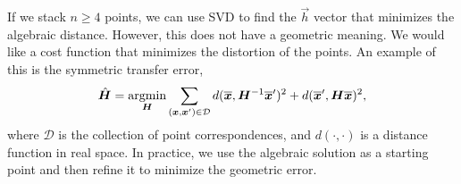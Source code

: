 If we stack $n \geq 4$ points, we can use SVD to find the $\vec{h}$ vector that
minimizes the algebraic distance. However, this does not have a geometric
meaning. We would like a cost function that minimizes the distortion of the
points. An example of this is the symmetric transfer error, \[
    \hat{\bm{H}} = \operatorname*{argmin}_{\bm{H}}
    \sum_{(\bm{x},\bm{x}')\in\mathcal{D}}
    d(\overline{\bm{x}},\bm{H}^{-1}\overline{\bm{x}}')^2 +
    d(\overline{\bm{x}}', \bm{H}\overline{\bm{x}})^2,
\]
where $\mathcal{D}$ is the collection of point correspondences, and $d(\cdot,
    \cdot)$ is a distance function in real space. In practice, we use the algebraic
solution as a starting point and then refine it to minimize the geometric error.
